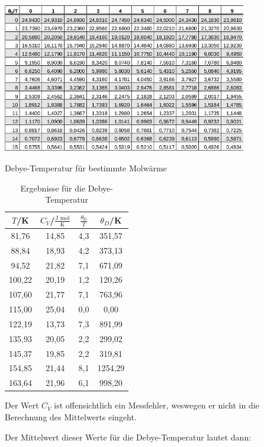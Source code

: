 \begin{table}
	\centering
		\includegraphics[width=0.8\textwidth]{debye.png}
	\caption{Debye-Temperatur für bestimmte Molwärme \cite{v47}}
	\label{fig:abb3}
\end{table}

\begin{table}[H]
	\begin{center}
		\begin{tabular}{c c c c}
			\toprule
			\(T\)/K & \(C_V\)/\(\frac{\text{J mol}}{\text{K}}\) & \(\frac{\theta_\text{D}}{T}\) & \(\theta_D\)/K \\
			\midrule
			81,76	&14,85	&4,3		&351,57\\
			88,84	&18,93	&4,2		&373,13\\
			94,52	&21,82	&7,1		&671,09\\
			100,22	&20,19	&1,2		&120,26\\
			107,60	&21,77	&7,1		&763,96\\
			115,00	&25,04	&0,0		&0,00\\
			122,19	&13,73	&7,3		&891,99\\
			135,93	&20,05	&2,2		&299,02\\
			145,37	&19,85	&2,2		&319,81\\
			154,85	&21,44	&8,1		&1254,29\\
			163,64	&21,96	&6,1		&998,20\\
			\bottomrule
		\end{tabular}
		\caption{Ergebnisse für die Debye-Temperatur}
		\label{fig:tab5}
	\end{center}
\end{table}

\noindent Der Wert \(C_V\) ist offensichtlich ein Messfehler, weswegen er nicht in die Berechnung des Mittelwerts eingeht.

\noindent Der Mittelwert dieser Werte für die Debye-Temperatur lautet dann:

